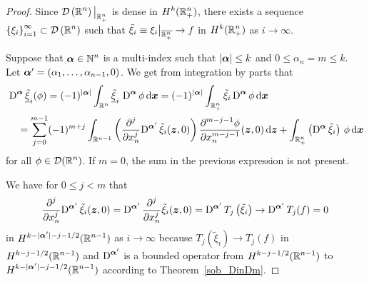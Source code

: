 \begin{proof}
Since $\displaystyle \DD\left(\RR^n\right)\big|_{\RR^n_+}$ is dense in
$\displaystyle H^k(\RR^n_+)$, there exists a sequence
$\displaystyle \left\{\xi_i\right\}_{i=1}^\infty \subset
\DD\left(\RR^n\right)$ such that
$\displaystyle \tilde{\xi}_i \equiv \xi_i\big|_{\overline{\RR^n_+}} \to f$ in
$\displaystyle H^k(\RR^n_+)$ as $i \to \infty$.

Suppose that $\displaystyle \VEC{\alpha} \in \NN^n$ is a multi-index such
that $|\VEC{\alpha}| \leq k$ and $0 \leq \alpha_n = m \leq k$.  Let
$\VEC{\alpha}' = (\alpha_1, \ldots, \alpha_{n-1},0)$.  We get from
integration by parts that
\begin{align}
&\diff^{\VEC{\alpha}} \underline{\tilde{\xi}}_i(\phi)
= (-1)^{|\VEC{\alpha}|} \int_{\RR^n}
\underline{\tilde{\xi}}_i\, \diff^{\VEC{\alpha}} \phi \dx{\VEC{x}}
= (-1)^{|\VEC{\alpha}|} \int_{\RR^n_+} \tilde{\xi}_i
\diff^{\VEC{\alpha}} \phi \dx{\VEC{x}}
\nonumber \\
&\quad = \sum_{j=0}^{m-1} (-1)^{m+j} \int_{\RR^{n-1}}
\left( \pdfdxn{\diff^{\VEC{\alpha}'} \tilde{\xi}_i}{x_n}{j}(\VEC{z},0) \right)
\pdydxn{\phi}{x_n}{m-j-1}(\VEC{z},0) 
\dx{\VEC{z}} + \int_{\RR^n_+} \left(\diff^{\VEC{\alpha}} \tilde{\xi}_i\right)\,
\phi \dx{\VEC{x}}   \label{H0TraceEq1}
\end{align}
for all $\displaystyle \phi \in \DD(\RR^n)$.  If $m=0$, the sum in the previous
expression is not present.

We have for $0 \leq j <m$ that
\[
\pdfdxn{\diff^{\VEC{\alpha}'} \tilde{\xi}_i}{x_n}{j}(\VEC{z},0)
= \diff^{\VEC{\alpha}'} \pdfdxn{\tilde{\xi}_i}{x_n}{j}(\VEC{z},0)
= \diff^{\VEC{\alpha}'}  T_j\left( \tilde{\xi}_i \right) \to 
\diff^{\VEC{\alpha}'}  T_j(f) = 0
\]
in $\displaystyle H^{k-|\VEC{\alpha}'|-j -1/2}(\RR^{n-1})$ as $i \to \infty$
because
$\displaystyle T_j\left( \tilde{\xi}_i \right) \to  T_j(f)$ in
$\displaystyle H^{k-j -1/2}(\RR^{n-1})$ and
$\displaystyle \diff^{\VEC{\alpha}'}$ is a bounded operator from
$\displaystyle H^{k-j -1/2}(\RR^{n-1})$ to
$\displaystyle H^{k-|\VEC{\alpha}'|-j -1/2}(\RR^{n-1})$ according to 
Theorem~\ref{sob_DinDm}.


\end{proof}
